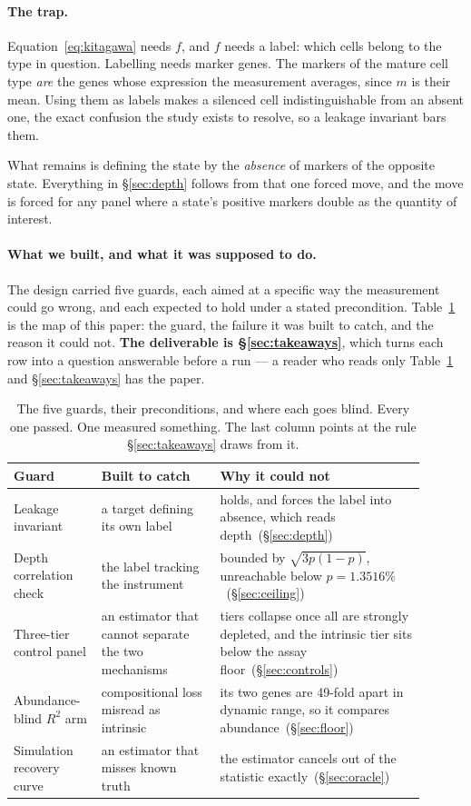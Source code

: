 \documentclass{article}
\begin{document}
\paragraph{The trap.} Equation~\ref{eq:kitagawa} needs $f$, and $f$ needs a
label: which cells belong to the type in question. Labelling needs marker genes.
The markers of the mature cell type \emph{are} the genes whose expression the
measurement averages, since $m$ is their mean. Using them as labels makes a
silenced cell indistinguishable from an absent one, the exact confusion the study
exists to resolve, so a leakage invariant bars them.

What remains is defining the state by the \emph{absence} of markers of the
opposite state. Everything in \S\ref{sec:depth} follows from that one forced
move, and the move is forced for any panel where a state's positive markers
double as the quantity of interest.

\paragraph{What we built, and what it was supposed to do.} The design carried five
guards, each aimed at a specific way the measurement could go wrong, and each
expected to hold under a stated precondition. Table~\ref{tab:guards} is the map
of this paper: the guard, the failure it was built to catch, and the reason it
could not. \textbf{The deliverable is \S\ref{sec:takeaways}}, which turns each
row into a question answerable before a run --- a reader who reads only
Table~\ref{tab:guards} and \S\ref{sec:takeaways} has the paper.

\begin{table}[h]
\small
\centering
\caption{The five guards, their preconditions, and where each goes blind. Every
one passed. One measured something. The last column points at the rule
\S\ref{sec:takeaways} draws from it.}
\label{tab:guards}
\begin{tabular}{@{}p{0.19\linewidth}p{0.26\linewidth}p{0.45\linewidth}@{}}
\toprule
\textbf{Guard} & \textbf{Built to catch} & \textbf{Why it could not} \\
\midrule
Leakage invariant & a target defining its own label & holds, and forces the
label into absence, which reads depth~(\S\ref{sec:depth}) \\
Depth correlation check & the label tracking the instrument & bounded by
$\sqrt{3p(1-p)}$, unreachable below $p = 1.3516\%$~(\S\ref{sec:ceiling}) \\
Three-tier control panel & an estimator that cannot separate the two mechanisms &
tiers collapse once all are strongly depleted, and the intrinsic tier sits below
the assay floor~(\S\ref{sec:controls}) \\
Abundance-blind $R^2$ arm & compositional loss misread as intrinsic & its two
genes are 49-fold apart in dynamic range, so it compares
abundance~(\S\ref{sec:floor}) \\
Simulation recovery curve & an estimator that misses known truth & the estimator
cancels out of the statistic exactly~(\S\ref{sec:oracle}) \\
\bottomrule
\end{tabular}
\end{table}
\end{document}
